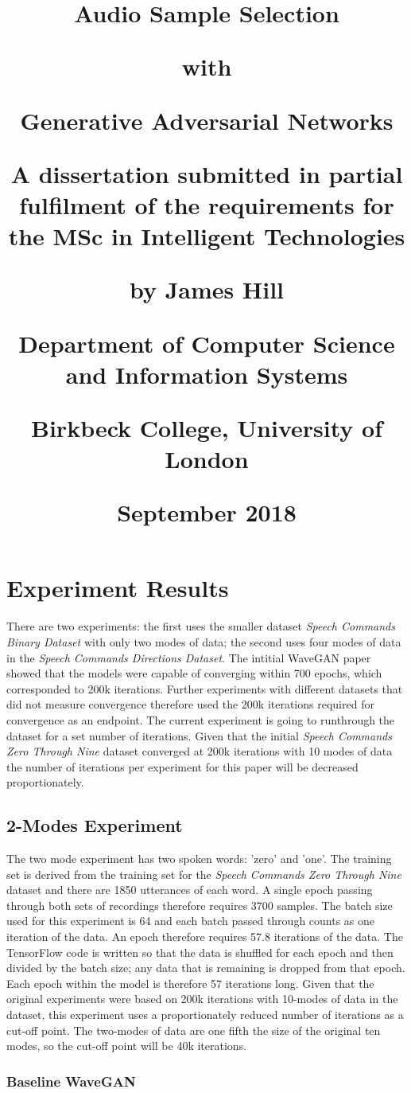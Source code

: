 \documentclass[a4paper, titlepage]{article}
\title{
  \begin{center}Audio Sample Selection\end{center}
  \begin{center}with\end{center}
  \begin{center}Generative Adversarial Networks\end{center}
  \begin{center}\end{center}
  \begin{center}A dissertation submitted in partial fulfilment of the requirements for the MSc in Intelligent Technologies\end{center}
  \begin{center}\end{center}
  \begin{center}by James Hill\end{center}
  \begin{center}\end{center}
  \begin{center}Department of Computer Science and Information Systems\end{center}
  \begin{center}Birkbeck College, University of London\end{center}
  \begin{center}\end{center}
  \begin{center}September 2018\end{center}
  }
\author{}
\date{}
\begin{document}
\section{Experiment Results}

There are two experiments: the first uses the smaller dataset \textit{Speech Commands Binary Dataset} with only two modes of data; the second uses four modes of data in the \textit{Speech Commands Directions Dataset}.
\newpage
\newpage
The intitial WaveGAN paper showed that the models were capable of converging within 700 epochs, which corresponded to 200k iterations.
Further experiments with different datasets that did not measure convergence therefore used the 200k iterations required for convergence as an endpoint.
\newpage
\newpage
The current experiment is going to runthrough the dataset for a set number of iterations.
Given that the initial \textit{Speech Commands Zero Through Nine} dataset converged at 200k iterations with 10 modes of data the number of iterations per experiment for this paper will be decreased proportionately.

\subsection{2-Modes Experiment}

The two mode experiment has two spoken words: 'zero' and 'one'.
The training set is derived from the training set for the \textit{Speech Commands Zero Through Nine} dataset and there are 1850 utterances of each word.
A single epoch passing through both sets of recordings therefore requires 3700 samples. 
\newpage
\newpage
The batch size used for this experiment is 64 and each batch passed through counts as one iteration of the data.
An epoch therefore requires 57.8 iterations of the data.
The TensorFlow code is written so that the data is shuffled for each epoch and then divided by the batch size; any data that is remaining is dropped from that epoch.
Each epoch within the model is therefore 57 iterations long.
\newpage
\newpage
Given that the original experiments were based on 200k iterations with 10-modes of data in the dataset, this experiment uses a proportionately reduced number of iterations as a cut-off point.
The two-modes of data are one fifth the size of the original ten modes, so the cut-off point will be 40k iterations.

\subsubsection{Baseline WaveGAN}
\end{document}
